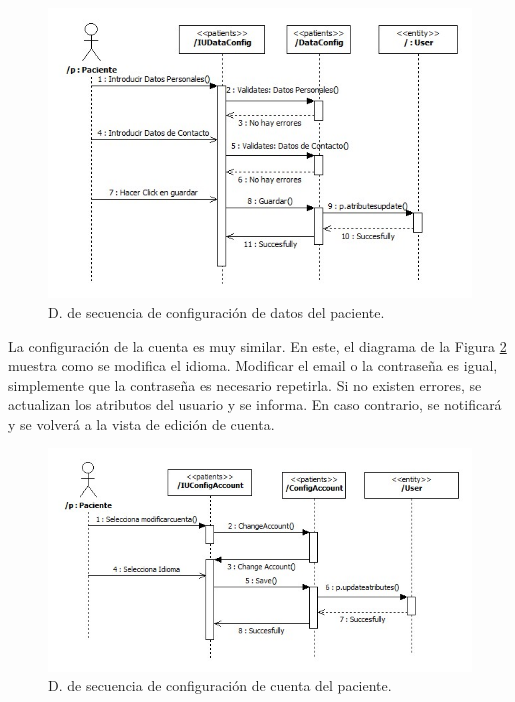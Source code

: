 					\begin{figure}[H]
					  \centering
					    \includegraphics[width=14cm]{img/jpg/secuencia/14_patients_config_data.jpg}
					  \caption{D. de secuencia de configuración de datos del paciente.}
					  \label{fig:cont_patient_config_data}
					\end{figure}
					
					La configuración de la cuenta es muy similar. En este, el diagrama de la Figura \ref{fig:cont_patient_config_account} muestra como se modifica el idioma. Modificar el email o la contraseña es igual, simplemente que la contraseña es necesario repetirla. Si no existen errores, se actualizan los atributos del usuario y se informa. En caso contrario, se notificará y se volverá a la vista de edición de cuenta.
					
					\begin{figure}[H]
					  \centering
					    \includegraphics[width=14cm]{img/jpg/secuencia/15_patients_config_account.jpg}
					  \caption{D. de secuencia de configuración de cuenta del paciente.}
					  \label{fig:cont_patient_config_account}
					\end{figure}
				
